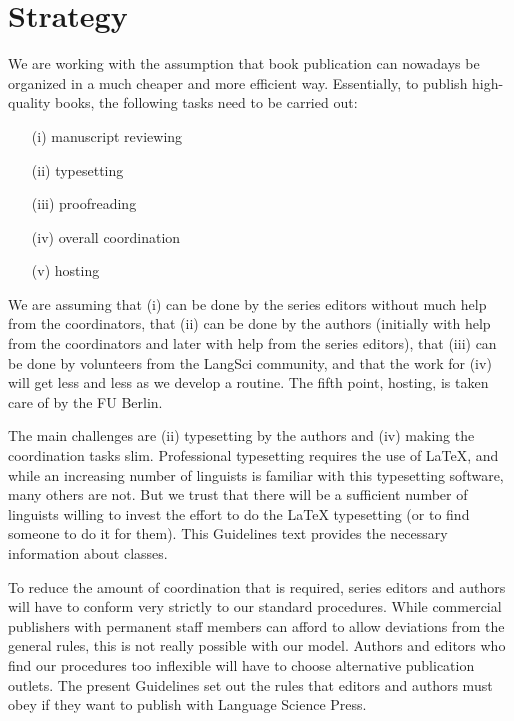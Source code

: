 
\section{Strategy}

We are working with the assumption that book publication can nowadays be organized in a much cheaper and more efficient way. Essentially, to publish high-quality books, the following tasks need to be carried out:

\begin{enumerate}
\item[(i)] manuscript reviewing
\item[(ii)] typesetting
\item[(iii)] proofreading
\item[(iv)] overall coordination
\item[(v)] hosting
\end{enumerate}

We are assuming that (i) can be done by the series editors without much help from the coordinators,
that (ii) can be done by the authors (initially with help from the coordinators and later with help
from the series editors), that (iii) can be done by volunteers from the LangSci community, and that
the work for (iv) will get less and less as we develop a routine. The fifth point, hosting, is taken
care of by the FU Berlin.

The main challenges are (ii) typesetting by the authors and (iv) making the coordination tasks
slim. Professional typesetting requires the use of LaTeX, and while an increasing number of
linguists is familiar with this typesetting software, many others are not. But we trust that there
will be a sufficient number of linguists willing to invest the effort to do the LaTeX typesetting
(or to find someone to do it for them). This Guidelines text provides the necessary information
about \latex classes.


To reduce the amount of coordination that is required, series editors and authors will have to conform very strictly to our standard procedures. While commercial publishers with permanent staff members can afford to allow deviations from the general rules, this is not really possible with our model. Authors and editors who find our procedures too inflexible will have to choose alternative publication outlets. The present Guidelines set out the rules that editors and authors must obey if they want to publish with Language Science Press.



